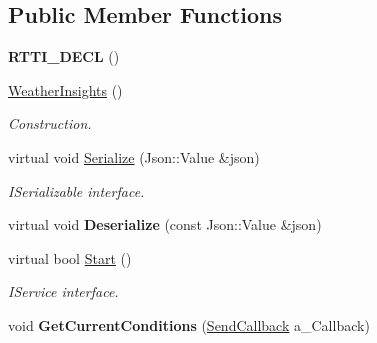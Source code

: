 \subsection*{Public Member Functions}
\begin{DoxyCompactItemize}
\item 
\mbox{\label{class_weather_insights_a6a74ebf2286bdc5b3acbe4ca6af9aff8}} 
{\bfseries R\+T\+T\+I\+\_\+\+D\+E\+CL} ()
\item 
\mbox{\label{class_weather_insights_a15e3f3a37d28ee9f89009dc2f8a4d1cb}} 
\hyperlink{class_weather_insights_a15e3f3a37d28ee9f89009dc2f8a4d1cb}{Weather\+Insights} ()
\begin{DoxyCompactList}\small\item\em Construction. \end{DoxyCompactList}\item 
\mbox{\label{class_weather_insights_a174a071d9530f6c261f343ae796fc6d1}} 
virtual void \hyperlink{class_weather_insights_a174a071d9530f6c261f343ae796fc6d1}{Serialize} (Json\+::\+Value \&json)
\begin{DoxyCompactList}\small\item\em I\+Serializable interface. \end{DoxyCompactList}\item 
\mbox{\label{class_weather_insights_ab69c0433a55f15011b2717a0ad376049}} 
virtual void {\bfseries Deserialize} (const Json\+::\+Value \&json)
\item 
\mbox{\label{class_weather_insights_a1b8186d82337f02c990d168b34cc5580}} 
virtual bool \hyperlink{class_weather_insights_a1b8186d82337f02c990d168b34cc5580}{Start} ()
\begin{DoxyCompactList}\small\item\em I\+Service interface. \end{DoxyCompactList}\item 
\mbox{\label{class_weather_insights_a5cc992dc2eab7e9b2a10a6cee5dfa1d9}} 
void {\bfseries Get\+Current\+Conditions} (\hyperlink{class_weather_insights_a65ee20ca4986e83a6de60b1f2a4e36ac}{Send\+Callback} a\+\_\+\+Callback)
\item 

\end{DoxyCompactItemize}
